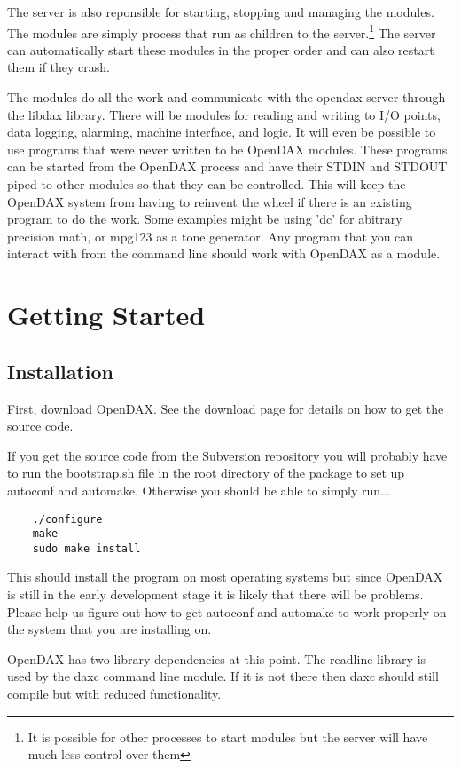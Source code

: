 \documentclass[10pt,letterpaper]{report}
\begin{document}
The server is also reponsible for starting, stopping and managing the modules.  The modules are simply process that run as children to the server.\footnote{It is possible for other processes to start modules but the server will have much less control over them}  The server can automatically start these modules in the proper order and can also restart them if they crash.

The modules do all the work and communicate with the opendax server through the libdax library. There will be modules for reading and writing to I/O points, data logging, alarming, machine interface, and logic. It will even be possible to use programs that were never written to be OpenDAX modules. These programs can be started from the OpenDAX process and have their STDIN and STDOUT piped to other modules so that they can be controlled. This will keep the OpenDAX system from having to reinvent the wheel if there is an existing program to do the work. Some examples might be using 'dc' for abitrary precision math, or mpg123 as a tone generator. Any program that you can interact with from the command line should work with OpenDAX as a module. 

\chapter{Getting Started}
\section{Installation}

First, download OpenDAX. See the download page for details on how to get the source code.

If you get the source code from the Subversion repository you will probably have to run the bootstrap.sh file in the root directory of the package to set up autoconf and automake. Otherwise you should be able to simply run...

\begin{verbatim}
    ./configure
    make
    sudo make install 
\end{verbatim} 
This should install the program on most operating systems but since OpenDAX is still in the early development stage it is likely that there will be problems. Please help us figure out how to get autoconf and automake to work properly on the system that you are installing on.

OpenDAX has two library dependencies at this point. The readline library is used by the daxc command line module. If it is not there then daxc should still compile but with reduced functionality.
\end{document}
